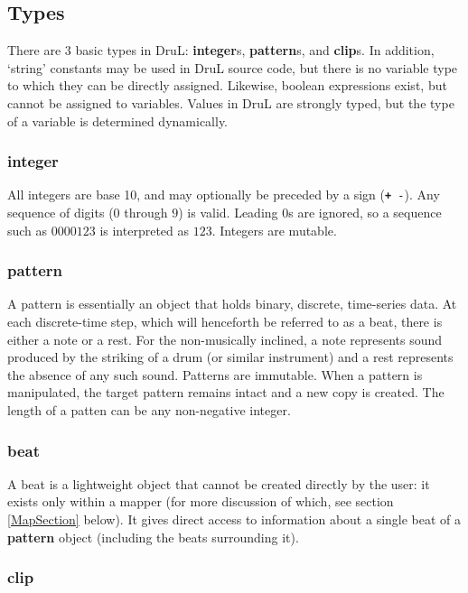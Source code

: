 \documentclass[11pt,twoside]{article}
\begin{document}
\subsection{Types}

There are $3$ basic types in DruL: \textbf{integer}s, \textbf{pattern}s,
and \textbf{clip}s.  In addition, `string' constants may be used in DruL source code, but there is no variable type to which they can be directly assigned.
Likewise, boolean expressions exist, but cannot be assigned to variables.
Values in DruL are strongly typed, but the type of a variable is determined dynamically.

\subsubsection{integer}

All integers are base 10, and may optionally be preceded by a sign ({\tt \textbf + -}).
Any sequence of digits ($0$ through $9$) is valid.  Leading $0$s are ignored, so a sequence such as $0000123$  is interpreted as $123$.  Integers are mutable.

\subsubsection{pattern}

A pattern is essentially an object that holds binary, discrete, time-series data.  At each discrete-time step, which will henceforth be referred to as a beat, there is either a note or a rest.  For the non-musically inclined, a note represents sound produced by the striking of a drum (or similar instrument) and a rest represents the absence of any such sound.  Patterns are immutable.  When a pattern is manipulated, the target pattern remains intact and a new copy is created.  The length of a patten can be any non-negative integer.

\subsubsection{beat}

A beat is a lightweight object that cannot be created directly by the user: it exists only within a mapper (for more discussion of which, see section \ref{MapSection} below).  It gives direct access to information about a single beat of a \textbf{pattern} object (including the beats surrounding it).

\subsubsection{clip}
\end{document}
